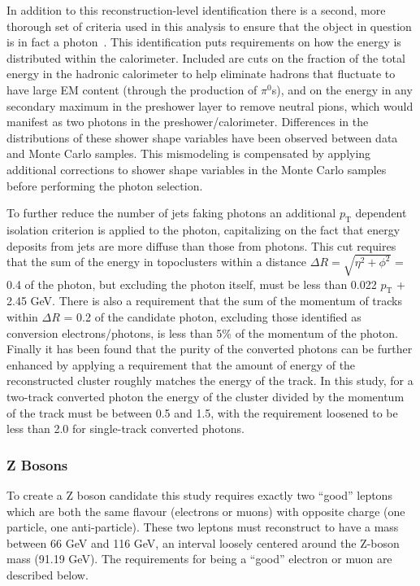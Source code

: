 In addition to this reconstruction-level identification there is a second, more thorough set of criteria used in this analysis to ensure that the object in question is in fact a photon~\cite{ATL-PHYS-PUB-2016-014}.  
This identification puts requirements on how the energy is distributed within the calorimeter.  
Included are cuts on the fraction of the total energy in the hadronic calorimeter to help eliminate hadrons that fluctuate to have large EM content (through the production of $\pi^0$s), and on the energy in any secondary maximum in the preshower layer to remove neutral pions, which would manifest as two photons in the preshower/calorimeter.  
Differences in the distributions of these shower shape variables have been observed between data and Monte Carlo samples.  
This mismodeling is compensated by applying additional corrections to shower shape variables in the Monte Carlo samples before performing the photon selection.  

To further reduce the number of jets faking photons an additional $p_{\mathrm{T}}$ dependent isolation criterion is applied to the photon, capitalizing on the fact that energy deposits from jets are more diffuse than those from photons.  
This cut requires that the sum of the energy in topoclusters within a distance $\Delta R=\sqrt{\eta^2+\phi^2}$ = 0.4 of the photon, but excluding the photon itself, must be less than 0.022 $p_{\mathrm{T}}$ + 2.45 GeV.  
There is also a requirement that the sum of the momentum of tracks within $\Delta R$ = 0.2 of the candidate photon, excluding those identified as conversion electrons/photons, is less than 5\% of the momentum of the photon.  
Finally it has been found that the purity of the converted photons can be further enhanced by applying a requirement that the amount of energy of the reconstructed cluster roughly matches the energy of the track.  
In this study, for a two-track converted photon the energy of the cluster divided by the momentum of the track must be between 0.5 and 1.5, with the requirement loosened to be less than 2.0 for single-track converted photons.  


\subsubsection{Z Bosons}
To create a Z boson candidate this study requires exactly two ``good'' leptons which are both the same flavour (electrons or muons) with opposite charge (one particle, one anti-particle). 
These two leptons must reconstruct to have a mass between 66 GeV and 116 GeV, an interval loosely centered around the Z-boson mass (91.19 GeV).  
The requirements for being a ``good'' electron or muon are described below.  

